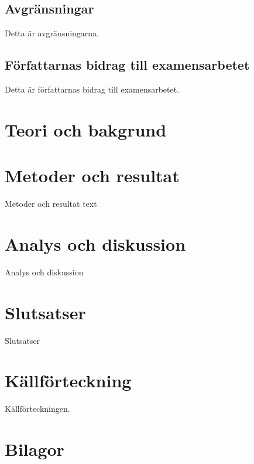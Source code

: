 \documentclass{kththesis}
\begin{document}
\section{Avgränsningar}
Detta är avgränsningarna.

\blindtext

\section{Författarnas bidrag till examensarbetet}
Detta är författarnas bidrag till examensarbetet.

\blindtext


\chapter{Teori och bakgrund}

\blindtext

\printbibliography[heading=bibintoc] %

\chapter{Metoder och resultat}
Metoder och resultat text
\blindtext


\chapter{Analys och diskussion}
Analys och diskussion
\blindtext


\chapter{Slutsatser}
Slutsatser
\blindtext

\chapter{Källförteckning}
Källförteckningen.


\chapter{Bilagor}
\end{document}
